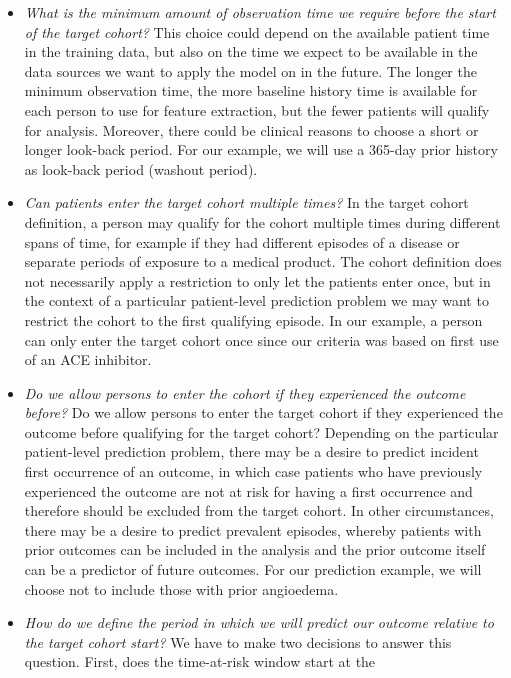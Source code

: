 \documentclass[11pt]{book}
\theoremstyle{definition}
\theoremstyle{definition}
\theoremstyle{definition}
\theoremstyle{remark}
\begin{document}
\begin{itemize}
\item
  \emph{What is the minimum amount of observation time we require before
  the start of the target cohort?} This choice could depend on the
  available patient time in the training data, but also on the time we
  expect to be available in the data sources we want to apply the model
  on in the future. The longer the minimum observation time, the more
  baseline history time is available for each person to use for feature
  extraction, but the fewer patients will qualify for analysis.
  Moreover, there could be clinical reasons to choose a short or longer
  look-back period. For our example, we will use a 365-day prior history
  as look-back period (washout period).
\item
  \emph{Can patients enter the target cohort multiple times?} In the
  target cohort definition, a person may qualify for the cohort multiple
  times during different spans of time, for example if they had
  different episodes of a disease or separate periods of exposure to a
  medical product. The cohort definition does not necessarily apply a
  restriction to only let the patients enter once, but in the context of
  a particular patient-level prediction problem we may want to restrict
  the cohort to the first qualifying episode. In our example, a person
  can only enter the target cohort once since our criteria was based on
  first use of an ACE inhibitor.
\item
  \emph{Do we allow persons to enter the cohort if they experienced the
  outcome before?} Do we allow persons to enter the target cohort if
  they experienced the outcome before qualifying for the target cohort?
  Depending on the particular patient-level prediction problem, there
  may be a desire to predict incident first occurrence of an outcome, in
  which case patients who have previously experienced the outcome are
  not at risk for having a first occurrence and therefore should be
  excluded from the target cohort. In other circumstances, there may be
  a desire to predict prevalent episodes, whereby patients with prior
  outcomes can be included in the analysis and the prior outcome itself
  can be a predictor of future outcomes. For our prediction example, we
  will choose not to include those with prior angioedema.
\item
  \emph{How do we define the period in which we will predict our outcome
  relative to the target cohort start?} We have to make two decisions to
  answer this question. First, does the time-at-risk window start at the

\end{itemize}
\end{document}
